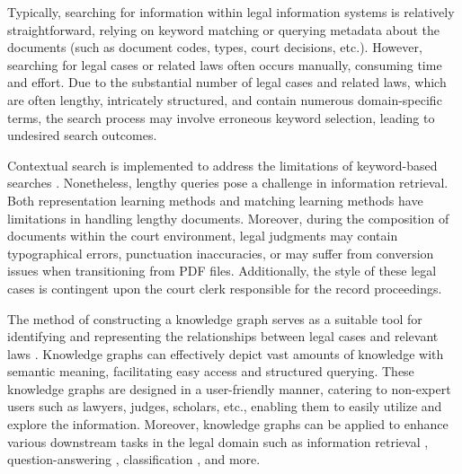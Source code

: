 \documentclass[conference]{IEEEtran}
\begin{document}
Typically, searching for information within legal information systems is relatively straightforward, relying on keyword matching or querying metadata about the documents (such as document codes, types, court decisions, etc.). However, searching for legal cases or related laws often occurs manually, consuming time and effort. Due to the substantial number of legal cases and related laws, which are often lengthy, intricately structured, and contain numerous domain-specific terms, the search process may involve erroneous keyword selection, leading to undesired search outcomes.

Contextual search is implemented to address the limitations of keyword-based searches \cite{maxwell2008concept}. Nonetheless, lengthy queries pose a challenge in information retrieval. Both representation learning methods and matching learning methods have limitations in handling lengthy documents. Moreover, during the composition of documents within the court environment, legal judgments may contain typographical errors, punctuation inaccuracies, or may suffer from conversion issues when transitioning from PDF files. Additionally, the style of these legal cases is contingent upon the court clerk responsible for the record proceedings.

The method of constructing a knowledge graph serves as a suitable tool for identifying and representing the relationships between legal cases and relevant laws \cite{casanovas2016semantic,fernandez2011legal}. Knowledge graphs can effectively depict vast amounts of knowledge with semantic meaning, facilitating easy access and structured querying. These knowledge graphs are designed in a user-friendly manner, catering to non-expert users such as lawyers, judges, scholars, etc., enabling them to easily utilize and explore the information. Moreover, knowledge graphs can be applied to enhance various downstream tasks in the legal domain such as information retrieval \cite{crotti2020knowledge}, question-answering \cite{cui2019kbqa, sovrano2020legal}, classification \cite{ashley2017artificial}, and more.
\end{document}
